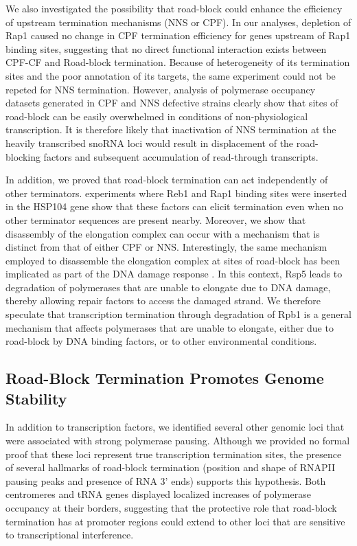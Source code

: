 We also investigated the possibility that road-block could enhance the efficiency of upstream termination mechanisms (NNS or CPF). 
In our analyses, depletion of Rap1 caused no change in CPF termination efficiency for genes upstream of Rap1 binding sites, suggesting that no direct functional interaction exists between CPF-CF and Road-block termination. 
Because of heterogeneity of its termination sites and the poor annotation of its targets, the same experiment could not be repeted for NNS termination.
However, analysis of polymerase occupancy datasets generated in CPF and NNS defective strains clearly show that sites of road-block can be easily overwhelmed in conditions of non-physiological transcription.
It is therefore likely that inactivation of NNS termination at the heavily transcribed snoRNA loci would result in displacement of the road-blocking factors and subsequent accumulation of read-through transcripts. 


In addition, we proved that road-block termination can act independently of other terminators.
\Invivo{} experiments where Reb1 and Rap1 binding sites were inserted in the HSP104 gene show that these factors can elicit termination even when no other terminator sequences are present nearby. 
Moreover, we show that disassembly of the elongation complex can occur with a mechanism that is distinct from that of either CPF or NNS. 
Interestingly, the same mechanism employed to disassemble the elongation complex at sites of road-block has been implicated as part of the DNA damage response \cite{beaudenon:1999:rsp5}. 
In this context, Rsp5 leads to degradation of polymerases that are unable to elongate due to DNA damage, thereby allowing repair factors to access the damaged strand. 
We therefore speculate that transcription termination through degradation of Rpb1 is a general mechanism that affects polymerases that are unable to elongate, either due to road-block by DNA binding factors, or to other environmental conditions.

\subsection{Road-Block Termination Promotes Genome Stability}

In addition to transcription factors, we identified several other genomic loci that were associated with strong polymerase pausing. 
Although we provided no formal proof that these loci represent true transcription termination sites, the presence of several hallmarks of road-block termination (position and shape of RNAPII pausing peaks and presence of RNA 3’ ends) supports this hypothesis. 
Both centromeres and tRNA genes displayed localized increases of polymerase occupancy at their borders, suggesting that the protective role that road-block termination has at promoter regions could extend to other loci that are sensitive to transcriptional interference. 

